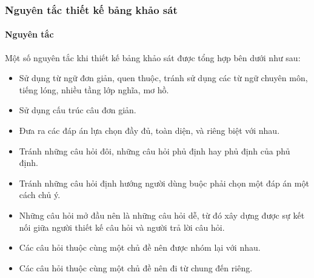 \subsubsection{Nguyên tắc thiết kế bảng khảo sát}

\paragraph{Nguyên tắc}\mbox{}

Một số nguyên tắc khi thiết kế bảng khảo sát được tổng hợp bên dưới như sau:
\begin{itemize}
    \item Sử dụng từ ngữ đơn giản, quen thuộc, tránh sử dụng các từ ngữ chuyên môn, tiếng lóng, nhiều tầng lớp nghĩa, mơ hồ.
    \item Sử dụng cấu trúc câu đơn giản.
    \item Đưa ra các đáp án lựa chọn đầy đủ, toàn diện, và riêng biệt với nhau.
    \item Tránh những câu hỏi đôi, những câu hỏi phủ định hay phủ định của phủ định.
    \item Tránh những câu hỏi định hướng người dùng buộc phải chọn 
 một đáp án một cách chủ ý.
    \item Những câu hỏi mở đầu nên là những câu hỏi dễ, từ đó xây dựng được sự kết nối giữa người thiết kế câu hỏi và người trả lời câu hỏi.
    \item Các câu hỏi thuộc cùng một chủ đề nên được nhóm lại với nhau.
    \item Các câu hỏi thuộc cùng một chủ đề nên đi từ chung đến riêng.
\end{itemize}


